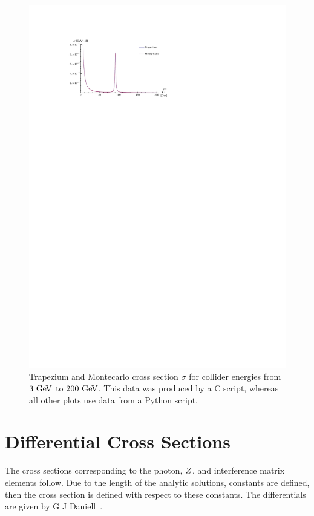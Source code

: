 \documentclass[]{article}
\begin{document}
\begin{figure}[H]
	\vspace{10pt}
	\hspace*{-0.1\textwidth}
	\centering
	\includegraphics[width=1.2\textwidth]{c_both}
	\caption{Trapezium and Montecarlo cross section $\sigma$ for collider energies from $3\GeV$ to $200\GeV$. This data was produced by a C script, whereas all other plots use data from a Python script.}
	\label{fig:cboth}
\end{figure}

\newpage

\appendix
\section{Differential Cross Sections}\label{app:differentials}

The cross sections corresponding to the photon, $Z $, and interference matrix elements follow. Due to the length of the analytic solutions, constants are defined, then the cross section is defined with respect to these constants. The differentials are given by G J Daniell~\cite{ref:gjdaniell}.
\end{document}
